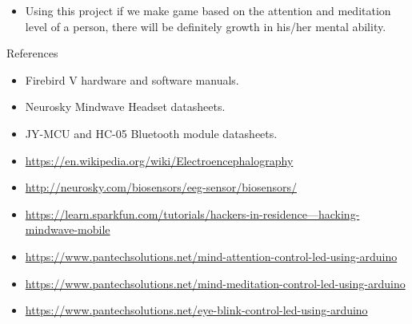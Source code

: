 \documentclass[14pt]{article}
\begin{document}
\begin{itemize}
	\item Using this project if we make game based on the attention and meditation level of a person, there will be definitely growth in his/her mental ability.
\end{itemize}

\break

\begin{center}
{\Huge References}
\end{center}

\begin{itemize}
	\item Firebird V hardware and software manuals.
	\item Neurosky Mindwave Headset datasheets.
	\item JY-MCU and HC-05 Bluetooth module datasheets.
	\item \href{https://en.wikipedia.org/wiki/Electroencephalography}{https://en.wikipedia.org/wiki/Electroencephalography}
	\item \href{http://neurosky.com/biosensors/eeg-sensor/biosensors/}{http://neurosky.com/biosensors/eeg-sensor/biosensors/}
	\item \href{https://learn.sparkfun.com/tutorials/hackers-in-residence---hacking-mindwave-mobile}{https://learn.sparkfun.com/tutorials/hackers-in-residence---hacking-mindwave-mobile}
	\item \href{https://www.pantechsolutions.net/mind-attention-control-led-using-arduino}{https://www.pantechsolutions.net/mind-attention-control-led-using-arduino}
	\item \href{https://www.pantechsolutions.net/mind-meditation-control-led-using-arduino}{https://www.pantechsolutions.net/mind-meditation-control-led-using-arduino}
	\item \href{https://www.pantechsolutions.net/eye-blink-control-led-using-arduino}{https://www.pantechsolutions.net/eye-blink-control-led-using-arduino}
\end{itemize}
\hspace{15pt}
\end{document}
